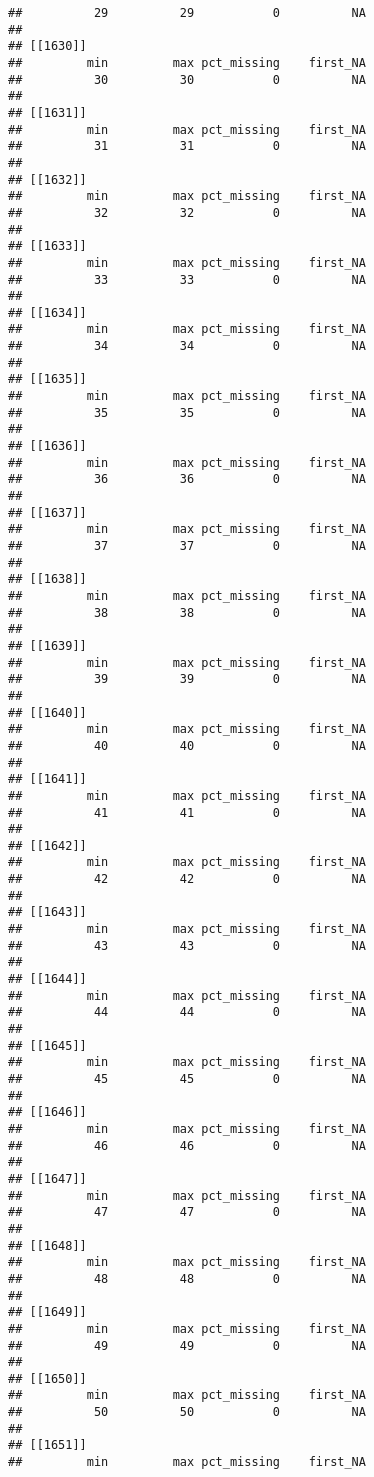 \documentclass[
]{article}
\begin{document}
\begin{verbatim}
##          29          29           0          NA 
## 
## [[1630]]
##         min         max pct_missing    first_NA 
##          30          30           0          NA 
## 
## [[1631]]
##         min         max pct_missing    first_NA 
##          31          31           0          NA 
## 
## [[1632]]
##         min         max pct_missing    first_NA 
##          32          32           0          NA 
## 
## [[1633]]
##         min         max pct_missing    first_NA 
##          33          33           0          NA 
## 
## [[1634]]
##         min         max pct_missing    first_NA 
##          34          34           0          NA 
## 
## [[1635]]
##         min         max pct_missing    first_NA 
##          35          35           0          NA 
## 
## [[1636]]
##         min         max pct_missing    first_NA 
##          36          36           0          NA 
## 
## [[1637]]
##         min         max pct_missing    first_NA 
##          37          37           0          NA 
## 
## [[1638]]
##         min         max pct_missing    first_NA 
##          38          38           0          NA 
## 
## [[1639]]
##         min         max pct_missing    first_NA 
##          39          39           0          NA 
## 
## [[1640]]
##         min         max pct_missing    first_NA 
##          40          40           0          NA 
## 
## [[1641]]
##         min         max pct_missing    first_NA 
##          41          41           0          NA 
## 
## [[1642]]
##         min         max pct_missing    first_NA 
##          42          42           0          NA 
## 
## [[1643]]
##         min         max pct_missing    first_NA 
##          43          43           0          NA 
## 
## [[1644]]
##         min         max pct_missing    first_NA 
##          44          44           0          NA 
## 
## [[1645]]
##         min         max pct_missing    first_NA 
##          45          45           0          NA 
## 
## [[1646]]
##         min         max pct_missing    first_NA 
##          46          46           0          NA 
## 
## [[1647]]
##         min         max pct_missing    first_NA 
##          47          47           0          NA 
## 
## [[1648]]
##         min         max pct_missing    first_NA 
##          48          48           0          NA 
## 
## [[1649]]
##         min         max pct_missing    first_NA 
##          49          49           0          NA 
## 
## [[1650]]
##         min         max pct_missing    first_NA 
##          50          50           0          NA 
## 
## [[1651]]
##         min         max pct_missing    first_NA 

\end{verbatim}
\end{document}
